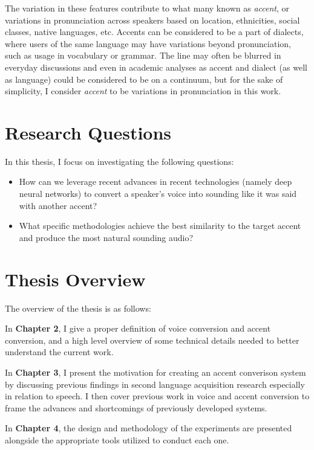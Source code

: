 \documentclass
[
    a4paper,
    twoside,
    12pt
]
{report}
\begin{document}
The variation in these features contribute to what many known as
\emph{accent}, or variations in pronunciation across speakers based on
location, ethnicities, social classes, native languages, etc. Accents
can be considered to be a part of dialects, where users of the same
language may have variations beyond pronunciation, such as usage in
vocabulary or grammar. The line may often be blurred in everyday
discussions and even in academic analyses as accent and dialect (as well
as language) could be considered to be on a continuum, but for the sake
of simplicity, I consider \emph{accent} to be variations in
pronunciation in this work.

\hypertarget{research-questions}{%
\section{Research Questions}\label{research-questions}}

In this thesis, I focus on investigating the following questions:

\begin{itemize}
\item
  How can we leverage recent advances in recent technologies (namely
  deep neural networks) to convert a speaker's voice into sounding like
  it was said with another accent?
\item
  What specific methodologies achieve the best similarity to the target
  accent and produce the most natural sounding audio?
\end{itemize}

\hypertarget{thesis-overview}{%
\section{Thesis Overview}\label{thesis-overview}}

The overview of the thesis is as follows:

In \textbf{Chapter 2}, I give a proper definition of voice conversion
and accent conversion, and a high level overview of some technical
details needed to better understand the current work.

In \textbf{Chapter 3}, I present the motivation for creating an accent
converison system by discussing previous findings in second language
acquisition research especially in relation to speech. I then cover
previous work in voice and accent conversion to frame the advances and
shortcomings of previously developed systems.

In \textbf{Chapter 4}, the design and methodology of the experiments are
presented alongside the appropriate tools utilized to conduct each one.
\end{document}
